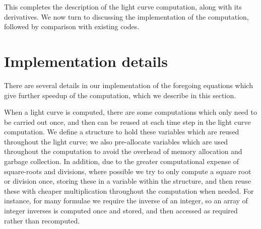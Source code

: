 \documentclass[modern,trackchanges]{aastex63}
\begin{document}
%
%
%
%

This completes the description of the light curve computation, along
with its derivatives.  We now turn to discussing the implementation of
the computation, followed by comparison with existing codes.

\section{Implementation details}
\label{sec:implementation}

There are several details in our implementation of the foregoing equations
which give further speedup of the computation, which we describe in this
section.

When a light curve is computed, there are some computations which only
need to be carried out once, and then can be reused at each time step in the
light curve computation.
We define a structure to hold these variables
which are reused throughout the light curve; we also pre-allocate variables which
are used throughout the computation to avoid the overhead of memory allocation
and garbage collection.  In addition, due to the greater
computational expense of square-roots and divisions, where possible we try
to only compute a square root or division once, storing these in a variable
within the structure, and then reuse these with cheaper multiplication
throughout the computation when needed.  For instance, for many formulae we
require the inverse of an integer, so an array of integer inverses is computed
once and stored, and then accessed as required rather than recomputed.
\end{document}
